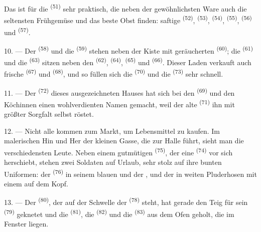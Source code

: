 Das ist für die  \textsuperscript{(51)} sehr praktisch, die neben der
gewöhnlichsten Ware auch die seltensten Frühgemüse und das beste Obst finden: saftige
 \textsuperscript{(52)},  \textsuperscript{(53)},
 \textsuperscript{(54)},  \textsuperscript{(55)},
 \textsuperscript{(56)} und 
\textsuperscript{(57)}.

\VUsaut{4.0mm}
\VUsaut{3.0mm}

10. --- Der  \textsuperscript{(58)} und die 
\textsuperscript{(59)} stehen neben der Kiste mit geräucherten 
\textsuperscript{(60)}; die  \textsuperscript{(61)} und die
 \textsuperscript{(63)} sitzen neben den 
\textsuperscript{(62)},  \textsuperscript{(64)},
 \textsuperscript{(65)} und 
\textsuperscript{(66)}. Dieser Laden verkauft auch frische 
\textsuperscript{(67)} und  \textsuperscript{(68)}, und so füllen sich
die  \textsuperscript{(70)} und die 
\textsuperscript{(73)} sehr schnell.

11. --- Der  \textsuperscript{(72)} dieses ausgezeichneten Hauses hat
sich bei den  \textsuperscript{(69)} und den Köchinnen einen
wohlverdienten Namen gemacht, weil der alte 
\textsuperscript{(71)} ihn mit größter Sorgfalt selbst röstet.

\VUsaut{4.0mm}
\VUsaut{3.0mm}

12. --- Nicht alle kommen zum Markt, um Lebensmittel zu kaufen. Im malerischen Hin
und Her der kleinen Gasse, die zur Halle führt, sieht man die verschiedensten Leute.
Neben einem gutmütigen  \textsuperscript{(75)}, der eine
 \textsuperscript{(74)} vor sich herschiebt, stehen zwei Soldaten
auf Urlaub, sehr stolz auf ihre bunten Uniformen: der 
\textsuperscript{(76)} in seinem blauen  und der ,
und der  in weiten Pluderhosen mit einem  auf dem
Kopf.

13. --- Der  \textsuperscript{(80)}, der auf der Schwelle der
 \textsuperscript{(78)} steht, hat gerade den Teig für sein
 \textsuperscript{(79)} geknetet und die 
\textsuperscript{(81)}, die  \textsuperscript{(82)} und die
 \textsuperscript{(83)} aus dem Ofen geholt, die im Fenster
liegen.

